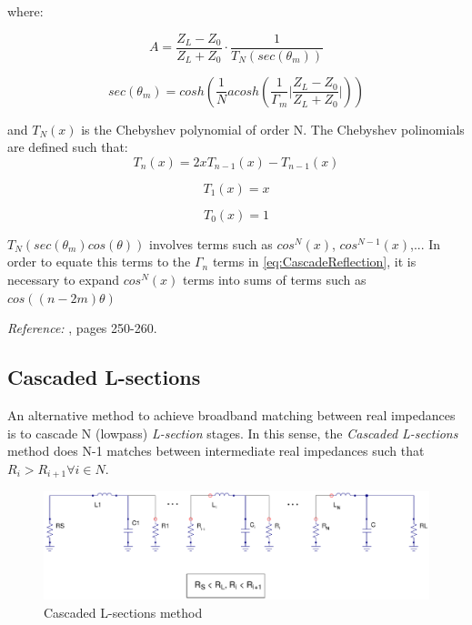 \noindent where:

\begin{equation}
 A = \frac{Z_L - Z_0}{Z_L + Z_0} \cdot \frac{1}{T_N(sec(\theta_m))}
\end{equation}

\begin{equation}
  sec(\theta_m) = cosh(\frac{1}{N} acosh\left( \frac{1}{\Gamma_m} \lvert \frac{Z_L - Z_0}{Z_L + Z_0} \rvert \right))
\end{equation}

\noindent and $T_N(x)$ is the Chebyshev polynomial of order N. The Chebyshev polinomials are defined such that:
\begin{equation}
 T_n(x) = 2xT_{n-1}(x) - T_{n-1}(x)
\end{equation}

\begin{equation}
T_1(x) = x
\end{equation}

\begin{equation}
T_0(x) = 1
\end{equation}

\noindent $T_N(sec(\theta_m)cos(\theta))$ involves terms such as $cos^N(x)$, $cos^{N-1}(x)$,... In order to equate this terms to the $\Gamma_n$ terms in \ref{eq:CascadeReflection}, it is necessary to expand $cos^N(x)$ terms into sums of terms such as $cos((n-2m)\theta)$

\noindent \textit{Reference:} \cite{Pozar}, pages 250-260.

\subsection{Cascaded L-sections}
An alternative method to achieve broadband matching between real impedances is to cascade N (lowpass) \textit{L-section} stages. In this sense, the \textit{Cascaded L-sections} method does N-1 matches between intermediate real impedances such that $R_i > R_{i+1} \forall i \in N$.

\begin{figure}[H]
\centering
\includegraphics[width=120mm]{CascadedLCsch}
\caption{Cascaded L-sections method}
\end{figure}

